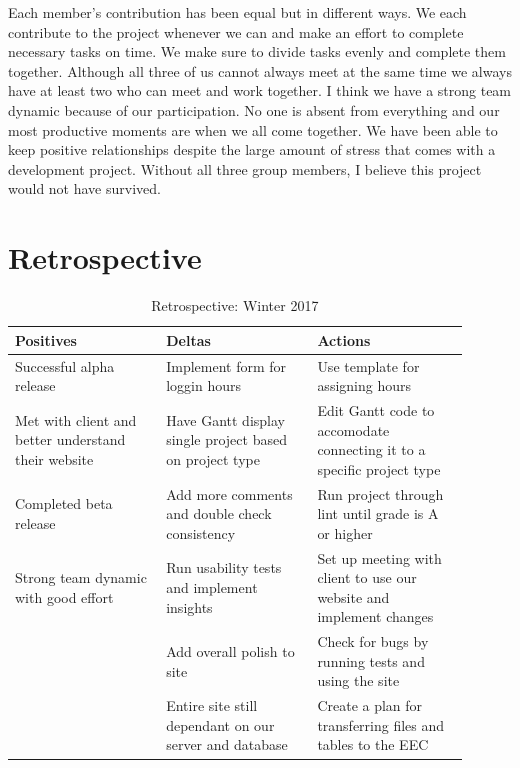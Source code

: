 \documentclass[letterpaper,10pt,titlepage,journal,compsoc,draftclsnofoot,onecolumn]{IEEEtran}
\newcommand\tab[1][1cm]{\hspace*{#1}}
\begin{document}
\tab
Each member’s contribution has been equal but in different ways. We each contribute to the project whenever we can and make an effort to complete necessary tasks on time. We make sure to divide tasks evenly and complete them together. Although all three of us cannot always meet at the same time we always have at least two who can meet and work together. I think we have a strong team dynamic because of our participation. No one is absent from everything and our most productive moments are when we all come together. We have been able to keep positive relationships despite the large amount of stress that comes with a development project. Without all three group members, I believe this project would not have survived.
\newline

\section{Retrospective}

\begin{table}[H]
			\caption{Retrospective: Winter 2017}
			\begin{center}
				\begin{tabular}{| p{0.3\linewidth} | p{0.3\linewidth} | p{0.3\linewidth} | }
					\hline
					 \textbf{Positives} & \textbf{Deltas} & \textbf{Actions} \\ [0.5ex]
					\hline
					Successful alpha release  & Implement form for loggin hours & Use template for assigning hours  \\
					\hline
					 Met with client and better understand their website  & Have Gantt display single project based on project type & Edit Gantt code to accomodate connecting it to a specific project type \\
					\hline
					 Completed beta release & Add more comments and double check consistency & Run project through lint until grade is A or higher \\
					\hline
					Strong team dynamic with good effort & Run usability tests and implement insights & Set up meeting with client to use our website and implement changes\\
					\hline
					 & Add overall polish to site  & Check for bugs by running tests and using the site\\
					\hline
					 & Entire site still dependant on our server and database & Create a plan for transferring files and tables to the EEC  \\
					\hline
				\end{tabular}
			\end{center}
			\end{table}
\end{document}
